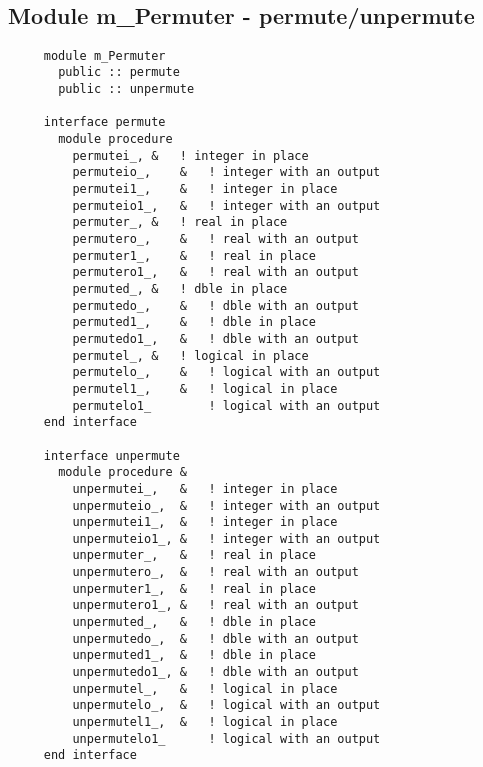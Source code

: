 \mbox{}\hrulefill\ 
 
  \subsection{Module m\_Permuter - permute/unpermute }

\begin{verbatim} 
     module m_Permuter
       public :: permute	
       public :: unpermute
 
     interface permute
       module procedure	
         permutei_,	&	! integer in place
         permuteio_,	&	! integer with an output
         permutei1_,	&	! integer in place
         permuteio1_,	&	! integer with an output
         permuter_,	&	! real in place
         permutero_,	&	! real with an output
         permuter1_,	&	! real in place
         permutero1_,	&	! real with an output
         permuted_,	&	! dble in place
         permutedo_,	&	! dble with an output
         permuted1_,	&	! dble in place
         permutedo1_,	&	! dble with an output
         permutel_,	&	! logical in place
         permutelo_,	&	! logical with an output
         permutel1_,	&	! logical in place
         permutelo1_		! logical with an output
     end interface
 
     interface unpermute
       module procedure	&
         unpermutei_,	&	! integer in place
         unpermuteio_,	&	! integer with an output
         unpermutei1_,	&	! integer in place
         unpermuteio1_,	&	! integer with an output
         unpermuter_,	&	! real in place
         unpermutero_,	&	! real with an output
         unpermuter1_,	&	! real in place
         unpermutero1_,	&	! real with an output
         unpermuted_,	&	! dble in place
         unpermutedo_,	&	! dble with an output
         unpermuted1_,	&	! dble in place
         unpermutedo1_,	&	! dble with an output
         unpermutel_,	&	! logical in place
         unpermutelo_,	&	! logical with an output
         unpermutel1_,	&	! logical in place
         unpermutelo1_		! logical with an output
     end interface
 \end{verbatim}%
 
 
\mbox{}\hrulefill\ 
 

